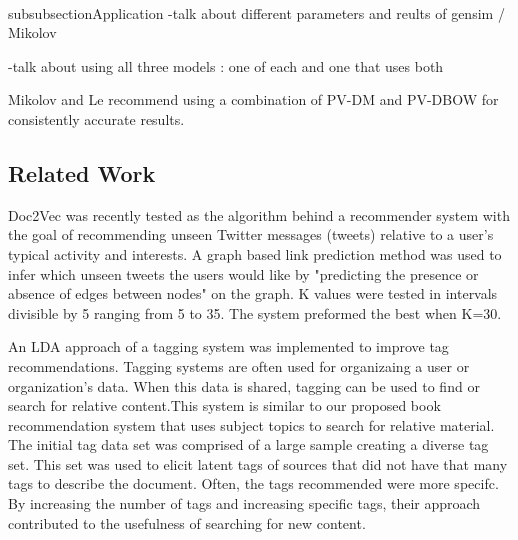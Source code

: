 \\subsubsection{Application}
-talk about different parameters and reults of gensim / Mikolov 

-talk about using all three models : one of each and one that uses both

Mikolov and Le recommend using a combination of PV-DM and PV-DBOW for consistently accurate results.  \cite{RefWorks:doc:5a6e5746e4b0d609eec798d7}

\subsection{Related Work}

Doc2Vec was recently tested as the algorithm behind a recommender system with the goal of recommending unseen Twitter messages (tweets) relative to a user's typical activity and interests. A graph based link prediction method was used to infer which unseen tweets the users would like by "predicting the presence or absence of edges between nodes" on the graph.  \cite{RefWorks:doc:5a6e5746e4b0d609eec798d9} K values were tested in intervals divisible by 5 ranging from 5 to 35. The system preformed the best when K=30.

An LDA approach of a tagging system was implemented to improve tag recommendations. \cite{RefWorks:doc:5a73e055e4b0cf1dd767b18f} Tagging systems are often used for organizaing a user or organization's data. When this data is shared, tagging can be used to find or search for relative content.This system is similar to our proposed book recommendation system that uses subject topics to search for relative material. The initial tag data set was comprised of a large sample creating a diverse tag set. This set was used to elicit latent tags of sources that did not have that many tags to describe the document. Often, the tags recommended were more specifc. By increasing the number of tags and increasing specific tags, their approach contributed to the usefulness of searching for new content. 



